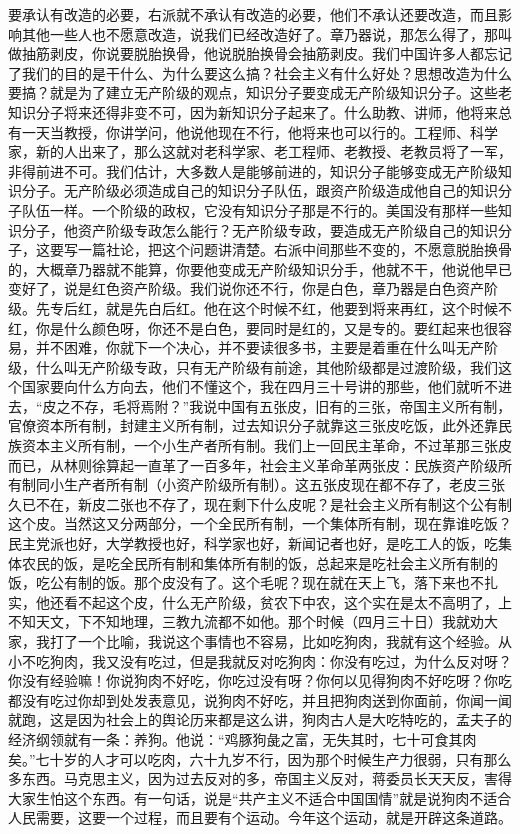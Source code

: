 要承认有改造的必要，右派就不承认有改造的必要，他们不承认还要改造，而且影响其他一些人也不愿意改造，说我们已经改造好了。章乃器说，那怎么得了，那叫做抽筋剥皮，你说要脱胎换骨，他说脱胎换骨会抽筋剥皮。我们中国许多人都忘记了我们的目的是干什么、为什么要这么搞？社会主义有什么好处？思想改造为什么要搞？就是为了建立无产阶级的观点，知识分子要变成无产阶级知识分子。这些老知识分子将来还得非变不可，因为新知识分子起来了。什么助教、讲师，他将来总有一天当教授，你讲学问，他说他现在不行，他将来也可以行的。工程师、科学家，新的人出来了，那么这就对老科学家、老工程师、老教授、老教员将了一军，非得前进不可。我们估计，大多数人是能够前进的，知识分子能够变成无产阶级知识分子。无产阶级必须造成自己的知识分子队伍，跟资产阶级造成他自己的知识分子队伍一样。一个阶级的政权，它没有知识分子那是不行的。美国没有那样一些知识分子，他资产阶级专政怎么能行？无产阶级专政，要造成无产阶级自己的知识分子，这要写一篇社论，把这个问题讲清楚。右派中间那些不变的，不愿意脱胎换骨的，大概章乃器就不能算，你要他变成无产阶级知识分手，他就不干，他说他早已变好了，说是红色资产阶级。我们说你还不行，你是白色，章乃器是白色资产阶级。先专后红，就是先白后红。他在这个时候不红，他要到将来再红，这个时候不红，你是什么颜色呀，你还不是白色，要同时是红的，又是专的。要红起来也很容易，并不困难，你就下一个决心，并不要读很多书，主要是着重在什么叫无产阶级，什么叫无产阶级专政，只有无产阶级有前途，其他阶级都是过渡阶级，我们这个国家要向什么方向去，他们不懂这个，我在四月三十号讲的那些，他们就听不进去，“皮之不存，毛将焉附？”我说中国有五张皮，旧有的三张，帝国主义所有制，官僚资本所有制，封建主义所有制，过去知识分子就靠这三张皮吃饭，此外还靠民族资本主义所有制，一个小生产者所有制。我们上一回民主革命，不过革那三张皮而已，从林则徐算起一直革了一百多年，社会主义革命革两张皮：民族资产阶级所有制同小生产者所有制（小资产阶级所有制）。这五张皮现在都不存了，老皮三张久已不在，新皮二张也不存了，现在剩下什么皮呢？是社会主义所有制这个公有制这个皮。当然这又分两部分，一个全民所有制，一个集体所有制，现在靠谁吃饭？民主党派也好，大学教授也好，科学家也好，新闻记者也好，是吃工人的饭，吃集体农民的饭，是吃全民所有制和集体所有制的饭，总起来是吃社会主义所有制的饭，吃公有制的饭。那个皮没有了。这个毛呢？现在就在天上飞，落下来也不扎实，他还看不起这个皮，什么无产阶级，贫农下中农，这个实在是太不高明了，上不知天文，下不知地理，三教九流都不如他。那个时候（四月三十日）我就劝大家，我打了一个比喻，我说这个事情也不容易，比如吃狗肉，我就有这个经验。从小不吃狗肉，我又没有吃过，但是我就反对吃狗肉：你没有吃过，为什么反对呀？你没有经验嘛！你说狗肉不好吃，你吃过没有呀？你何以见得狗肉不好吃呀？你吃都没有吃过你却到处发表意见，说狗肉不好吃，并且把狗肉送到你面前，你闻一闻就跑，这是因为社会上的舆论历来都是这么讲，狗肉古人是大吃特吃的，孟夫子的经济纲领就有一条：养狗。他说：“鸡豚狗彘之富，无失其时，七十可食其肉矣。”七十岁的人才可以吃肉，六十九岁不行，因为那个时候生产力很弱，只有那么多东西。马克思主义，因为过去反对的多，帝国主义反对，蒋委员长天天反，害得大家生怕这个东西。有一句话，说是“共产主义不适合中国国情”就是说狗肉不适合人民需要，这要一个过程，而且要有个运动。今年这个运动，就是开辟这条道路。

